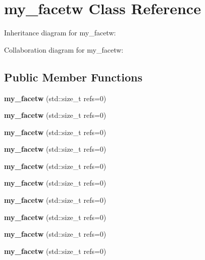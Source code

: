 \hypertarget{classmy__facetw}{}\section{my\+\_\+facetw Class Reference}
\label{classmy__facetw}


Inheritance diagram for my\+\_\+facetw\+:


Collaboration diagram for my\+\_\+facetw\+:
\subsection*{Public Member Functions}
\begin{DoxyCompactItemize}
\item 
\mbox{\label{classmy__facetw_a58ec55e18e3c03cd760116bbe51e8a10}} 
{\bfseries my\+\_\+facetw} (std\+::size\+\_\+t refs=0)
\item 
\mbox{\label{classmy__facetw_a58ec55e18e3c03cd760116bbe51e8a10}} 
{\bfseries my\+\_\+facetw} (std\+::size\+\_\+t refs=0)
\item 
\mbox{\label{classmy__facetw_a58ec55e18e3c03cd760116bbe51e8a10}} 
{\bfseries my\+\_\+facetw} (std\+::size\+\_\+t refs=0)
\item 
\mbox{\label{classmy__facetw_a58ec55e18e3c03cd760116bbe51e8a10}} 
{\bfseries my\+\_\+facetw} (std\+::size\+\_\+t refs=0)
\item 
\mbox{\label{classmy__facetw_a58ec55e18e3c03cd760116bbe51e8a10}} 
{\bfseries my\+\_\+facetw} (std\+::size\+\_\+t refs=0)
\item 
\mbox{\label{classmy__facetw_a58ec55e18e3c03cd760116bbe51e8a10}} 
{\bfseries my\+\_\+facetw} (std\+::size\+\_\+t refs=0)
\item 
\mbox{\label{classmy__facetw_a58ec55e18e3c03cd760116bbe51e8a10}} 
{\bfseries my\+\_\+facetw} (std\+::size\+\_\+t refs=0)
\item 
\mbox{\label{classmy__facetw_a58ec55e18e3c03cd760116bbe51e8a10}} 
{\bfseries my\+\_\+facetw} (std\+::size\+\_\+t refs=0)
\item 
\mbox{\label{classmy__facetw_a58ec55e18e3c03cd760116bbe51e8a10}} 
{\bfseries my\+\_\+facetw} (std\+::size\+\_\+t refs=0)
\item 
\mbox{\label{classmy__facetw_a58ec55e18e3c03cd760116bbe51e8a10}} 
{\bfseries my\+\_\+facetw} (std\+::size\+\_\+t refs=0)
\end{DoxyCompactItemize}



